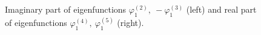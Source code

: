 \documentclass[authoryear]{elsarticle}
\begin{document}
\begin{figure}[!h]
  \begin{center}
\begin{minipage}{0.49\linewidth}
 \\
\end{minipage}
\hfill
\begin{minipage}{0.49\linewidth}
 \\
\end{minipage}
\caption{Imaginary part of eigenfunctions $\varphi^{(2)}_1, \ - \varphi^{(3)}_1$ (left) and  real part of eigenfunctions $\varphi^{(4)}_1, \ \varphi^{(5)}_1$  (right).}
\label{fig:5}
  \end{center}
\end{figure}
\end{document}
